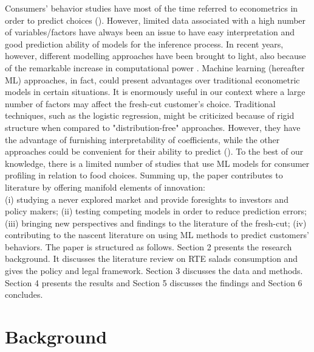 \documentclass[a4,12pt]{article}
\begin{document}
Consumers' behavior studies have most of the time referred to econometrics in order to predict choices (\cite{Storm19}). However, limited data associated with a high number of variables/factors have always been an issue to have easy interpretation and good prediction ability of models for the inference process. In recent years, however, different modelling approaches have been brought to light, also because of the remarkable increase in computational power \cite{Hastie16}. Machine learning (hereafter ML) approaches, in fact, could present advantages over traditional econometric models in certain situations. It is enormously useful in our context where a large number of factors may affect the fresh-cut customer's choice. Traditional techniques, such as the logistic regression, might be criticized because of rigid structure when compared to "distribution-free" approaches. However, they have the advantage of furnishing interpretability of coefficients, while the other approaches could be convenient for their ability to predict  (\cite{Lucun15}). To the best of our knowledge, there is a limited number of studies that use ML models for consumer profiling in relation to food choices. Summing up, the paper contributes to literature by offering manifold elements of innovation: \\
(i) studying a never explored market and provide foresights to investors and policy makers; (ii) testing competing models in order to reduce prediction errors; (iii) bringing new perspectives and findings to the literature of the fresh-cut; (iv) contributing to the nascent literature on using ML methods to predict customers' behaviors. 
The paper is structured as follows. Section 2 presents the research background. It discusses the literature review on RTE salads consumption and gives the policy and legal framework. Section 3 discusses the data and methods. Section 4 presents the results and Section 5 discusses the findings and Section 6 concludes. 


\section{Background}
\end{document}
